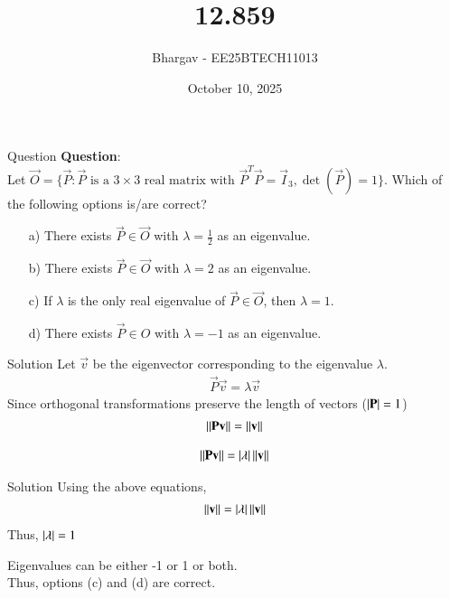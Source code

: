 \documentclass{beamer}
\title{12.859}
\date{October 10, 2025}
\author{Bhargav - EE25BTECH11013}
\begin{document}
\frame{\titlepage}

\begin{frame}{Question}
\textbf{Question}: \\
Let $\vec{O} = \{\vec{P} : \vec{P} \text{ is a } 3 \times 3 \text{ real matrix with } \vec{P}^T\vec{P} = \vec{I}_3, \det(\vec{P}) = 1\}$. Which of the following options is/are correct?

\begin{enumerate}
    \item[a)] There exists $\vec{P} \in \vec{O}$ with $\lambda = \frac{1}{2}$ as an eigenvalue.
    \item[b)] There exists $\vec{P} \in \vec{O}$ with $\lambda = 2$ as an eigenvalue.
    \item[c)] If $\lambda$ is the only real eigenvalue of $\vec{P} \in 
    \vec{O}$, then $\lambda = 1$.
    \item[d)] There exists $\vec{P} \in O$ with $\lambda = -1$ as an eigenvalue.
\end{enumerate}
\end{frame}

\begin{frame}{Solution}
Let $\vec{v}$ be the eigenvector corresponding to the eigenvalue $\lambda$.
\begin{align}
\vec{P}\vec{v} = \lambda\vec{v}
\end{align}
Since orthogonal transformations preserve the length of vectors  ($\left\vert\mathbf{P}\right\vert = 1$)
\begin{align}
\left\lVert\mathbf{P}\mathbf{v}\right\rVert=\left\lVert\mathbf{v}\right\rVert 
\end{align}

\begin{align}
\left\lVert\mathbf{P}\mathbf{v}\right\rVert = \left\vert\lambda\right\vert\left\lVert\mathbf{v}\right\rVert
\end{align}


\end{frame}

\begin{frame}{Solution}
Using the above equations,
\begin{align}
\left\lVert\mathbf{v}\right\rVert = \left\vert\lambda\right\vert\left\lVert\mathbf{v}\right\rVert
\end{align}
Thus, $\left\vert\lambda\right\vert = 1$

Eigenvalues can be either -1 or 1 or both. \\

Thus, options (c) and (d) are correct. \\ \\ \\
\end{frame}
\end{document}
